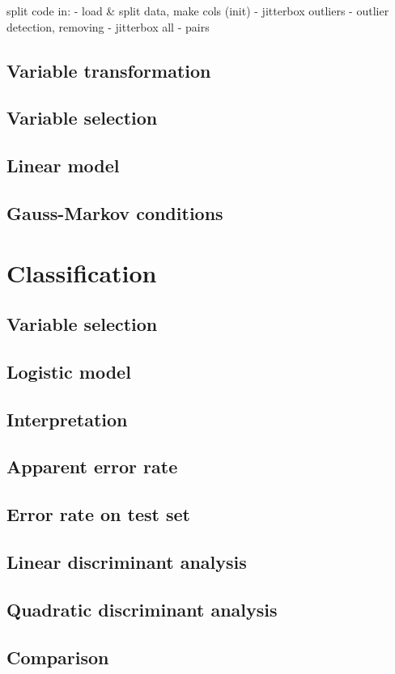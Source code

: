 \documentclass[a4paper, 12pt]{article}
\begin{document}
split code in:
- load \& split data, make cols (init)
- jitterbox outliers
- outlier detection, removing
- jitterbox all
- pairs



\subsection*{Variable transformation}
\subsection*{Variable selection}
\subsection*{Linear model}
\subsection*{Gauss-Markov conditions}

\section{Classification}
\subsection*{Variable selection}
\subsection*{Logistic model}
\subsection*{Interpretation}
\subsection*{Apparent error rate}
\subsection*{Error rate on test set}
\subsection*{Linear discriminant analysis}
\subsection*{Quadratic discriminant analysis}
\subsection*{Comparison}
\end{document}
